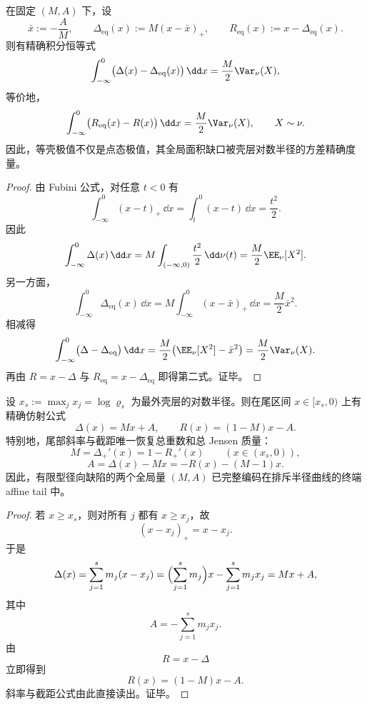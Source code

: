 \begin{theorem}[等壳极值的方差缺口恒等式]\label{thm:conclusion-equal-shell-variance-gap-identity}
在固定 \((M,A)\) 下，设
\[
\bar x:=-\frac{A}{M},
\qquad
\Delta_{\mathrm{eq}}(x):=M(x-\bar x)_+,
\qquad
R_{\mathrm{eq}}(x):=x-\Delta_{\mathrm{eq}}(x).
\]
则有精确积分恒等式
\[
\int_{-\infty}^{0}\bigl(\Delta(x)-\Delta_{\mathrm{eq}}(x)\bigr)\,\dd x
=
\frac{M}{2}\Var_\nu(X),
\]
等价地，
\[
\int_{-\infty}^{0}\bigl(R_{\mathrm{eq}}(x)-R(x)\bigr)\,\dd x
=
\frac{M}{2}\Var_\nu(X),
\qquad
X\sim \nu.
\]
因此，等壳极值不仅是点态极值，其全局面积缺口被壳层对数半径的方差精确度量。
\end{theorem}
\begin{proof}
由 Fubini 公式，对任意 \(t<0\) 有
\[
\int_{-\infty}^{0}(x-t)_+\,\dd x
=
\int_{t}^{0}(x-t)\,\dd x
=
\frac{t^2}{2}.
\]
因此
\[
\int_{-\infty}^{0}\Delta(x)\,\dd x
=
M\int_{(-\infty,0)}\frac{t^2}{2}\,\dd \nu(t)
=
\frac{M}{2}\EE_\nu[X^2].
\]
另一方面，
\[
\int_{-\infty}^{0}\Delta_{\mathrm{eq}}(x)\,\dd x
=
M\int_{-\infty}^{0}(x-\bar x)_+\,\dd x
=
\frac{M}{2}\bar x^2.
\]
相减得
\[
\int_{-\infty}^{0}\bigl(\Delta-\Delta_{\mathrm{eq}}\bigr)\,\dd x
=
\frac{M}{2}\bigl(\EE_\nu[X^2]-\bar x^2\bigr)
=
\frac{M}{2}\Var_\nu(X).
\]
再由 \(R=x-\Delta\) 与 \(R_{\mathrm{eq}}=x-\Delta_{\mathrm{eq}}\) 即得第二式。证毕。
\end{proof}

\begin{theorem}[排斥半径尾部的刚性恢复]\label{thm:conclusion-exclusion-radius-tail-affine-recovery}
设 \(x_s:=\max_j x_j=\log \varrho_s\) 为最外壳层的对数半径。则在尾区间 \(x\in[x_s,0)\) 上有精确仿射公式
\[
\Delta(x)=Mx+A,
\qquad
R(x)=(1-M)x-A.
\]
特别地，尾部斜率与截距唯一恢复总重数和总 Jensen 质量：
\[
M=\Delta_+'(x)=1-R_+'(x)\qquad (x\in(x_s,0)),
\]
\[
A=\Delta(x)-Mx=-R(x)-(M-1)x.
\]
因此，有限型径向缺陷的两个全局量 \((M,A)\) 已完整编码在排斥半径曲线的终端 affine tail 中。
\end{theorem}
\begin{proof}
若 \(x\ge x_s\)，则对所有 \(j\) 都有 \(x\ge x_j\)，故
\[
(x-x_j)_+=x-x_j.
\]
于是
\[
\Delta(x)=\sum_{j=1}^{s}m_j(x-x_j)
=
\Bigl(\sum_{j=1}^{s}m_j\Bigr)x-\sum_{j=1}^{s}m_jx_j
=
Mx+A,
\]
其中
\[
A=-\sum_{j=1}^{s}m_jx_j.
\]
由
\[
R=x-\Delta
\]
立即得到
\[
R(x)=(1-M)x-A.
\]
斜率与截距公式由此直接读出。证毕。
\end{proof}


